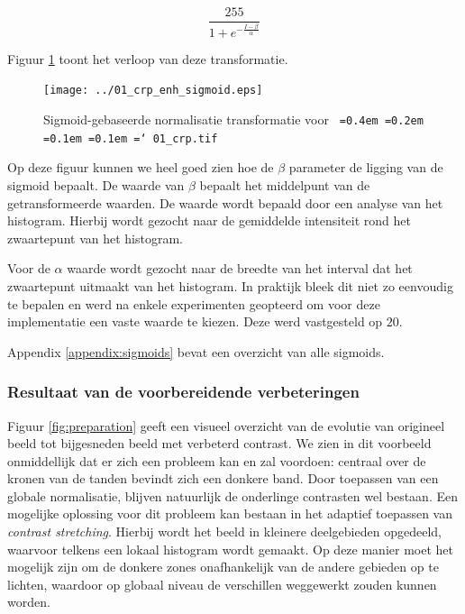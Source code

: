 \documentclass[10pt,a4paper]{article}
\newcommand*\justify{%
  \fontdimen2\font=0.4em%
  \fontdimen3\font=0.2em%
  \fontdimen4\font=0.1em%
  \fontdimen7\font=0.1em%
  \hyphenchar\font=`\-%
}
\newcommand{\ttt}[1]{{\tt \justify{#1}}}
\begin{document}
\begin{equation} \label{eq:sigmoid-impl}
\frac{255}{1+e^{-\frac{I - \beta}{\alpha}}}
\end{equation}

Figuur \ref{fig:sigmoid} toont het verloop van deze transformatie. 

\begin{figure}
\centering
 \texttt{[image: ../01\_crp\_enh\_sigmoid.eps]}
\caption{Sigmoid-gebaseerde normalisatie transformatie voor \ttt{01\_crp.tif}}
 \label{fig:sigmoid}
\end{figure}

Op deze figuur kunnen we heel goed zien hoe de $\beta$ parameter de ligging van de sigmoid bepaalt. De waarde van $\beta$ bepaalt het middelpunt van de getransformeerde waarden. De waarde wordt bepaald door een analyse van het histogram. Hierbij wordt gezocht naar de gemiddelde intensiteit rond het zwaartepunt van het histogram.

Voor de $\alpha$ waarde wordt gezocht naar de breedte van het interval dat het zwaartepunt uitmaakt van het histogram. In praktijk bleek dit niet zo eenvoudig te bepalen en werd na enkele experimenten geopteerd om voor deze implementatie een vaste waarde te kiezen. Deze werd vastgesteld op $20$.

Appendix \ref{appendix:sigmoids} bevat een overzicht van alle sigmoids.

\subsubsection*{Resultaat van de voorbereidende verbeteringen}

Figuur \ref{fig:preparation} geeft een visueel overzicht van de evolutie van origineel beeld tot bijgesneden beeld met verbeterd contrast. We zien in dit voorbeeld onmiddellijk dat er zich een probleem kan en zal voordoen: centraal over de kronen van de tanden bevindt zich een donkere band. Door toepassen van een globale normalisatie, blijven natuurlijk de onderlinge contrasten wel bestaan. Een mogelijke oplossing voor dit probleem kan bestaan in het adaptief toepassen van \emph{contrast stretching}. Hierbij wordt het beeld in kleinere deelgebieden opgedeeld, waarvoor telkens een lokaal histogram wordt gemaakt. Op deze manier moet het mogelijk zijn om de donkere zones onafhankelijk van de andere gebieden op te lichten, waardoor op globaal niveau de verschillen weggewerkt zouden kunnen worden.
\end{document}
